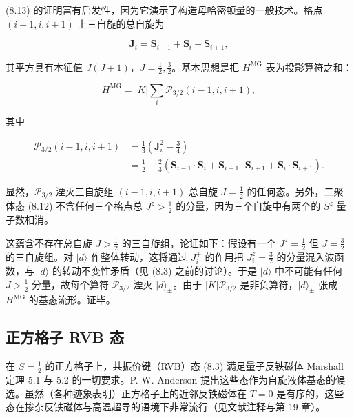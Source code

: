 (8.13) 的证明富有启发性，因为它演示了构造母哈密顿量的一般技术。格点 $(i-1, i, i+1)$ 上三自旋的总自旋为

\begin{equation*}
\mathbf {J} _ {i} = \mathbf {S} _ {i - 1} + \mathbf {S} _ {i} + \mathbf {S} _ {i + 1} ,
\tag{8.14}
\end{equation*}

其平方具有本征值 $J(J + 1)$，$J = \frac{1}{2}, \frac{3}{2}$。基本思想是把 $H^{\mathrm{MG}}$ 表为投影算符之和：

\begin{equation*}
H ^ {\mathrm{MG}} = | K | \sum_ {i} \mathcal {P} _ {3/2} ( i - 1, i, i + 1 ) ,
\tag{8.15}
\end{equation*}

其中

\begin{align*}
\mathcal {P} _ {3/2} ( i - 1, i, i + 1 ) & = \frac {1}{3} \left( \mathbf {J} _ {i} ^ {2} - \frac {3}{4} \right)\\
& = \frac {1}{2} + \frac {2}{3} \left( \mathbf {S} _ {i - 1} \cdot \mathbf {S} _ {i} + \mathbf {S} _ {i - 1} \cdot \mathbf {S} _ {i + 1} + \mathbf {S} _ {i} \cdot \mathbf {S} _ {i + 1} \right) .
\tag{8.16}
\end{align*}

显然，$\mathcal{P}_{3/2}$ 湮灭三自旋组 $(i-1, i, i+1)$ 总自旋 $J = \frac{1}{2}$ 的任何态。另外，二聚体态 (8.12) 不含任何三个格点总 $J^{z} > \frac{1}{2}$ 的分量，因为三个自旋中有两个的 $S^{z}$ 量子数相消。

这蕴含不存在总自旋 $J > \frac{1}{2}$ 的三自旋组，论证如下：假设有一个 $J^{z} = \frac{1}{2}$ 但 $J = \frac{3}{2}$ 的三自旋组。对 $|d\rangle$ 作整体转动，这将通过 $J_{i}^{+}$ 的作用把 $J_{i}^{z} = \frac{3}{2}$ 的分量混入波函数，与 $|d\rangle$ 的转动不变性矛盾（见 (8.3) 之前的讨论）。于是 $|d\rangle$ 中不可能有任何 $J > \frac{1}{2}$ 分量，故每个算符 $\mathcal{P}_{3/2}$ 湮灭 $|d\rangle_{\pm}$。由于 $|K|\mathcal{P}_{3/2}$ 是非负算符，$|d\rangle_{\pm}$ 张成 $H^{\mathrm{MG}}$ 的基态流形。证毕。

\subsection{正方格子 RVB 态}

在 $S = \frac{1}{2}$ 的正方格子上，共振价键（RVB）态 (8.3) 满足量子反铁磁体 Marshall 定理 5.1 与 5.2 的一切要求。P. W. Anderson 提出这些态作为自旋液体基态的候选。虽然（各种迹象表明）正方格子上的近邻反铁磁体在 $T = 0$ 是有序的，这些态在掺杂反铁磁体与高温超导的语境下非常流行（见文献注释与第 19 章）。

